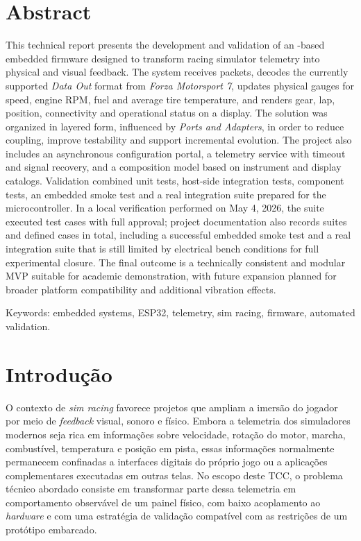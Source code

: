 \documentclass[12pt,oneside,a4paper]{article}
\renewcommand{\texttt}[1]{\begingroup\ttfamily\seqsplit{#1}\endgroup}
\begin{document}
\section*{Abstract}
This technical report presents the development and validation of an
\texttt{ESP32}-based embedded firmware designed to transform racing simulator
telemetry into physical and visual feedback. The system receives \texttt{UDP}
packets, decodes the currently supported \textit{Data Out} format from
\textit{Forza Motorsport 7}, updates physical gauges for speed, engine RPM,
fuel and average tire temperature, and renders gear, lap, position,
connectivity and operational status on a \texttt{TFT} display. The solution was
organized in layered form, influenced by \textit{Ports and Adapters}, in order
to reduce coupling, improve testability and support incremental evolution. The
project also includes an asynchronous \texttt{Wi-Fi} configuration portal, a
telemetry service with timeout and signal recovery, and a composition model
based on instrument and display catalogs. Validation combined unit tests,
host-side integration tests, component tests, an embedded smoke test and a real
\texttt{UDP} integration suite prepared for the microcontroller. In a local
verification performed on May 4, 2026, the \texttt{test\_native} suite executed
\texttt{68/68} test cases with full approval; project documentation also
records \texttt{18} suites and \texttt{73} defined cases in total, including a
successful embedded smoke test and a real \texttt{UDP} integration suite that
is still limited by electrical bench conditions for full experimental closure.
The final outcome is a technically consistent and modular MVP suitable for
academic demonstration, with future expansion planned for broader platform
compatibility and additional vibration effects.

Keywords: embedded systems, ESP32, telemetry, sim racing, firmware, automated
validation.

\newpage
\tableofcontents
\newpage

\section{Introdução}
\label{sec:introducao}

O contexto de \textit{sim racing} favorece projetos que ampliam a imersão do
jogador por meio de \textit{feedback} visual, sonoro e físico. Embora a telemetria dos
simuladores modernos seja rica em informações sobre velocidade, rotação do
motor, marcha, combustível, temperatura e posição em pista, essas informações
normalmente permanecem confinadas a interfaces digitais do próprio jogo ou a
aplicações complementares executadas em outras telas. No escopo deste TCC, o
problema técnico abordado consiste em transformar parte dessa telemetria em
comportamento observável de um painel físico, com baixo acoplamento ao \textit{hardware}
e com uma estratégia de validação compatível com as restrições de um protótipo
embarcado.
\end{document}
